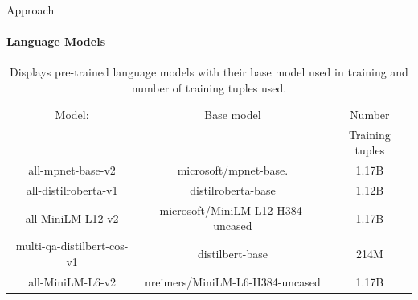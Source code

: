 \documentclass[aspectratio=169]{beamer}
\begin{document}
\begin{frame}{Approach}
\framesubtitle{Language Models}
\begin{table}
	\begin{center}
		\begin{tabular}{ |c|c|c| }
			\hline
			Model: & Base model & Number \\&&Training tuples  
			\\ \hline 
			all-mpnet-base-v2\cite{SBERT} & 	microsoft/mpnet-base. &1.17B
			
			\\ \hline
			all-distilroberta-v1\cite{SBERT} & 	distilroberta-base &1.12B
			\\ \hline
			all-MiniLM-L12-v2\cite{SBERT} & 		microsoft/MiniLM-L12-H384-uncased &1.17B
			\\ \hline
			multi-qa-distilbert-cos-v1\cite{SBERT} & 	distilbert-base &214M
			\\ \hline
			all-MiniLM-L6-v2\cite{SBERT} & 		nreimers/MiniLM-L6-H384-uncased &1.17B
			\\ \hline
		\end{tabular}
		\caption{Displays pre-trained language models with their base model used in training and number of training tuples used\cite{SBERT}.}
		\label{table:language models}
	\end{center}
\end{table}
\end{frame}
\end{document}

